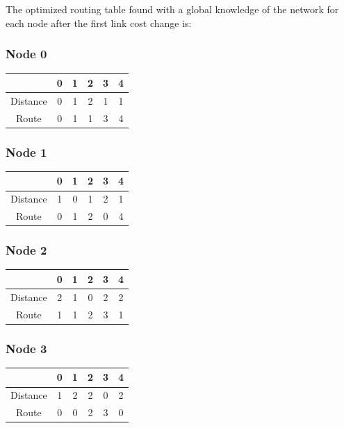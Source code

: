 \documentclass[a4paper,11pt,final]{report}
\begin{document}
The optimized routing table found with a global knowledge of the network
for each node after the first link cost change is:

\subsubsection{Node 0}

\begin{tabular}{|c|c|c|c|c|c|}
\hline
& 0 & 1 & 2 & 3 & 4 \\ \hline
Distance & 0 & 1 & 2 & 1 & 1 \\ \hline
Route & 0 & 1 & 1 & 3 & 4 \\ \hline
\end{tabular}

\subsubsection{Node 1}

\begin{tabular}{|c|c|c|c|c|c|}
\hline
& 0 & 1 & 2 & 3 & 4 \\ \hline
Distance & 1 & 0 & 1 & 2 & 1 \\ \hline
Route & 0 & 1 & 2 & 0 & 4 \\ \hline
\end{tabular}

\subsubsection{Node 2}

\begin{tabular}{|c|c|c|c|c|c|}
\hline
& 0 & 1 & 2 & 3 & 4 \\ \hline
Distance & 2 & 1 & 0 & 2 & 2 \\ \hline
Route & 1 & 1 & 2 & 3 & 1 \\ \hline
\end{tabular}

\subsubsection{Node 3}

\begin{tabular}{|c|c|c|c|c|c|}
\hline
& 0 & 1 & 2 & 3 & 4 \\ \hline
Distance & 1 & 2 & 2 & 0 & 2 \\ \hline
Route & 0 & 0 & 2 & 3 & 0 \\ \hline
\end{tabular}
\end{document}
